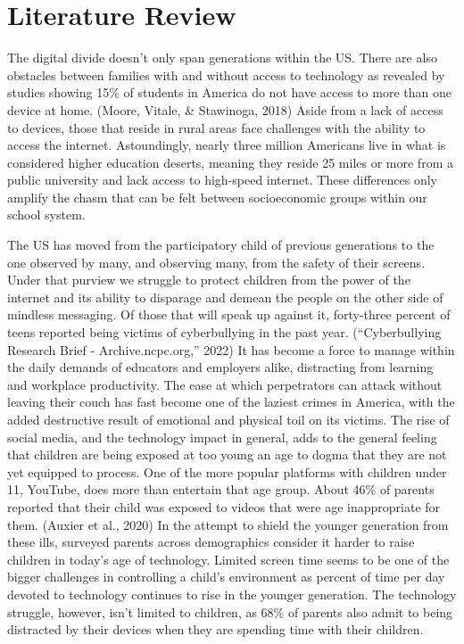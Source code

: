 \documentclass[
  man,LLO-8200, Introduction to Data Science]{apa6}
\begin{document}
\hypertarget{literature-review}{%
\section{Literature Review}\label{literature-review}}

The digital divide doesn't only span generations within the US. There are also obstacles between families with and without access to technology as revealed by studies showing 15\% of students in America do not have access to more than one device at home. (Moore, Vitale, \& Stawinoga, 2018) Aside from a lack of access to devices, those that reside in rural areas face challenges with the ability to access the internet. Astoundingly, nearly three million Americans live in what is considered higher education deserts, meaning they reside 25 miles or more from a public university and lack access to high-speed internet. These differences only amplify the chasm that can be felt between socioeconomic groups within our school system.

The US has moved from the participatory child of previous generations to the one observed by many, and observing many, from the safety of their screens. Under that purview we struggle to protect children from the power of the internet and its ability to disparage and demean the people on the other side of mindless messaging. Of those that will speak up against it, forty-three percent of teens reported being victims of cyberbullying in the past year. ({``Cyberbullying Research Brief - Archive.ncpc.org,''} 2022) It has become a force to manage within the daily demands of educators and employers alike, distracting from learning and workplace productivity. The ease at which perpetrators can attack without leaving their couch has fast become one of the laziest crimes in America, with the added destructive result of emotional and physical toil on its victims.
The rise of social media, and the technology impact in general, adds to the general feeling that children are being exposed at too young an age to dogma that they are not yet equipped to process. One of the more popular platforms with children under 11, YouTube, does more than entertain that age group. About 46\% of parents reported that their child was exposed to videos that were age inappropriate for them. (Auxier et al., 2020) In the attempt to shield the younger generation from these ills, surveyed parents across demographics consider it harder to raise children in today's age of technology. Limited screen time seems to be one of the bigger challenges in controlling a child's environment as percent of time per day devoted to technology continues to rise in the younger generation. The technology struggle, however, isn't limited to children, as 68\% of parents also admit to being distracted by their devices when they are spending time with their children.
\end{document}

